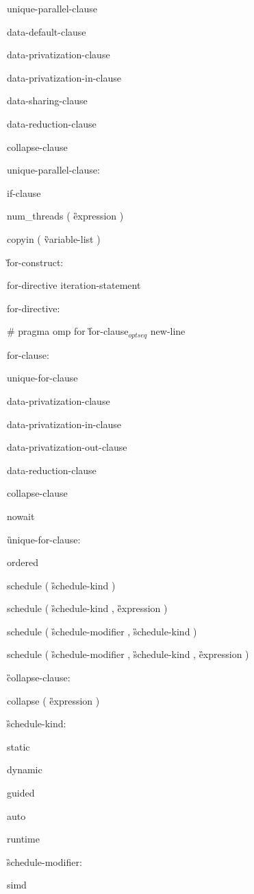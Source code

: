 {\I unique-parallel-clause

\I data-default-clause 

\I data-privatization-clause 

\I data-privatization-in-clause 

\I data-sharing-clause 

\I data-reduction-clause 

\I collapse-clause

unique-parallel-clause:

\I if-clause

\C\I num\_threads ( \G expression \C )

\C\I copyin ( \G variable-list \C )

\G for-construct:

\I for-directive iteration-statement

for-directive:

\C\I \# pragma omp for \G for-clause$_{optseq}$ new-line

for-clause:

\I unique-for-clause

\I data-privatization-clause 

\I data-privatization-in-clause 

\I data-privatization-out-clause 

\I data-reduction-clause 

\I collapse-clause

\C\I nowait

\G unique-for-clause:

\C\I ordered

\I schedule ( \G schedule-kind \C )

\I schedule ( \G schedule-kind \C, \G expression \C )

\I schedule ( \G schedule-modifier \C, \G schedule-kind \C )

\I schedule ( \G schedule-modifier \C, \G schedule-kind \C, \G expression \C )

\G collapse-clause:

\C\I collapse ( \G expression \C )

\G schedule-kind:

\C\I static

\I dynamic

\I guided

\I auto

\I runtime

\G schedule-modifier:

\C\I simd

}
